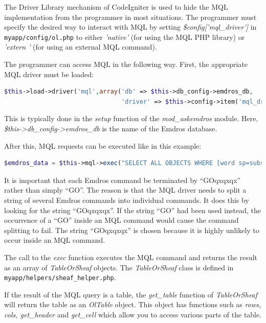 \documentclass[11pt,oneside,a4paper]{memoir}
\newcommand{\q}{{\mainnolig '}}
\begin{document}
The Driver Library mechanism of CodeIgniter is used to hide the MQL implementation from the
programmer in most situations. The programmer must specify the desired way to interact with MQL by
setting \emph{\$config[\q mql\_driver\q]} in \texttt{myapp/config/ol.php} to either
\emph{\q native\q} (for using the MQL PHP library) or \emph{\q extern
  \q} (for using an external MQL command).

The programmer can access MQL in the following way. First, the appropriate MQL driver must be
loaded:

\begin{lstlisting}[language=PHP]
$this->load->driver('mql',array('db' => $this->db_config->emdros_db,
                                'driver' => $this->config->item('mql_driver')));
\end{lstlisting}

This is typically done in the \emph{setup} function of the \emph{mod\_askemdros} module. Here,
\emph{\$this->db\_config\allowbreak{}->emdros\_db} is the name of the Emdros database.

After this, MQL requests can be executed like in this example:

\begin{lstlisting}[language=PHP]
$emdros_data = $this->mql->exec("SELECT ALL OBJECTS WHERE [word sp=subs GET text] GOqxqxqx");
\end{lstlisting}

It is important that each Emdros command be terminated by ``GOqxqxqx'' rather than simply ``GO''. The
reason is that the MQL driver needs to split a string of several Emdros commands into individual
commands. It does this by looking for the string ``GOqxqxqx''. If the string ``GO'' had been used
instead, the occurrence of a ``GO'' inside an MQL command would cause the command splitting to fail.
The string ``GOqxqxqx'' is chosen because it is highly unlikely to occur inside an MQL command.

The call to the \emph{exec} function executes the MQL command and returns the result as an array of
\emph{TableOrSheaf} objects. The \emph{TableOrSheaf} class is defined in
\texttt{myapp/helpers/sheaf\_helper.php}.

If the result of the MQL query is a table, the \emph{get\_table} function of \emph{TableOrSheaf}
will return the table as an \emph{OlTable} object.  This object has functions
such as \emph{rows, cols, get\_header} and \emph{get\_cell} which allow you to
access various parts of the table.
\end{document}
